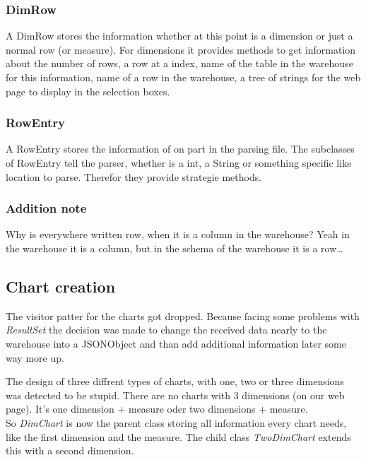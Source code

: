 \subsubsection{DimRow}
A DimRow stores the information whether at this point is a dimension or just a normal row (or measure).
For dimensions it provides methods to get information about the number of rows, a row at a index,
name of the table in the warehouse for this information, name of a row in the warehouse, 
a tree of strings for the web page to display in the selection boxes.


\subsubsection{RowEntry}
A RowEntry stores the information of on part in the parsing file. The subclasses of RowEntry
tell the parser, whether is a int, a String or something specific like location to parse. Therefor
they provide strategie methods.


\subsubsection{Addition note}
Why is everywhere written row, when it is a column in the warehouse? Yeah in the warehouse
it is a column, but in the schema of the warehouse it is a row\ldots




\subsection{Chart creation}
The visitor patter for the charts got dropped. Because facing some problems with \textit{ResultSet}
the decision was made to change the received data nearly to the warehouse into a JSONObject
and than add additional information later some way more up.

The design of three diffrent types of charts, with one, two or three dimensions was detected to
be stupid. There are no charts with 3 dimensions (on our web page). It's one dimension + measure
oder two dimensions + measure.\\
So \textit{DimChart} is now the parent class storing all information every chart needs, like
the first dimension and the measure. The child class \textit{TwoDimChart} extends this with a second dimension.


